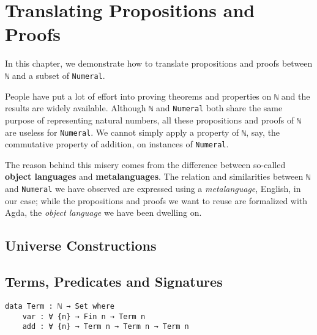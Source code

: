 \documentclass[\main/thesis.tex]{subfiles}
\begin{document}
\chapter{Translating Propositions and Proofs}\label{translation}

In this chapter, we demonstrate how to translate propositions and proofs between
\lstinline|ℕ| and a subset of \lstinline|Numeral|.

People have put a lot of effort into proving theorems and properties on
\lstinline|ℕ| and the results are widely available.
Although \lstinline|ℕ| and \lstinline|Numeral| both share the same purpose of
representing natural numbers, all these propositions and proofs of \lstinline|ℕ|
are useless for \lstinline|Numeral|.
We cannot simply apply a property of \lstinline|ℕ|, say,
the commutative property of addition, on instances of \lstinline|Numeral|.

The reason behind this misery comes from the difference between so-called
\textbf{object languages} and \textbf{metalanguages}.
The relation and similarities between \lstinline|ℕ| and \lstinline|Numeral|
we have observed are expressed using a \textit{metalanguage}, English, in our case;
while the propositions and proofs we want to reuse are formalized with Agda,
the \textit{object language} we have been dwelling on.




\section{Universe Constructions}



\section{Terms, Predicates and Signatures}


\begin{lstlisting}
data Term : ℕ → Set where
    var : ∀ {n} → Fin n → Term n
    add : ∀ {n} → Term n → Term n → Term n
\end{lstlisting}
\end{document}
